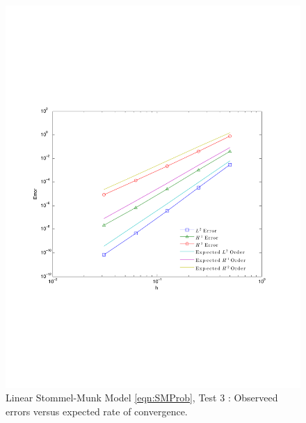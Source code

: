 \begin{figure}
  \begin{center}
    \includegraphics[scale=0.5]{Figures/SMsinConvergence.pdf}
    \caption{Linear Stommel-Munk Model \eqref{eqn:SMProb}, Test 3 \cite{Cascon}:
      Observeed errors versus expected rate of convergence.}
    \label{fig:SMSinErrors}
  \end{center}
\end{figure}


